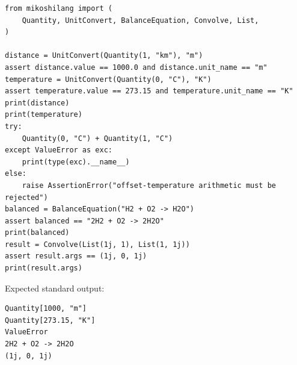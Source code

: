 \begin{lstlisting}[style=mikoshi]
from mikoshilang import (
    Quantity, UnitConvert, BalanceEquation, Convolve, List,
)

distance = UnitConvert(Quantity(1, "km"), "m")
assert distance.value == 1000.0 and distance.unit_name == "m"
temperature = UnitConvert(Quantity(0, "C"), "K")
assert temperature.value == 273.15 and temperature.unit_name == "K"
print(distance)
print(temperature)
try:
    Quantity(0, "C") + Quantity(1, "C")
except ValueError as exc:
    print(type(exc).__name__)
else:
    raise AssertionError("offset-temperature arithmetic must be rejected")
balanced = BalanceEquation("H2 + O2 -> H2O")
assert balanced == "2H2 + O2 -> 2H2O"
print(balanced)
result = Convolve(List(1j, 1), List(1, 1j))
assert result.args == (1j, 0, 1j)
print(result.args)
\end{lstlisting}
\noindent Expected standard output:
\begin{lstlisting}[style=mikoshi]
Quantity[1000, "m"]
Quantity[273.15, "K"]
ValueError
2H2 + O2 -> 2H2O
(1j, 0, 1j)
\end{lstlisting}
